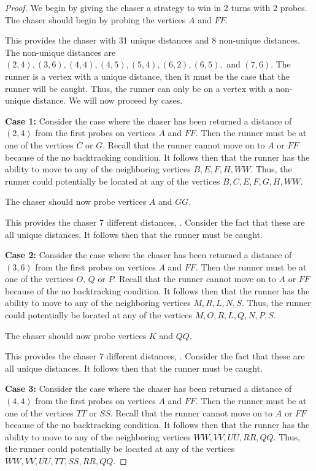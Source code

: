 \documentclass[11pt]{article}
\begin{document}
	\begin{proof}
		We begin by giving the chaser a strategy to win in 2 turns with 2 probes. The chaser should begin by probing the vertices $A$ and $FF$.
		
		This provides the chaser with 31 unique distances and 8 non-unique distances. The non-unique distances are $(2,4),(3,6),(4,4),(4,5),(5,4),(6,2),(6,5),$ and $(7,6)$. The runner is a vertex with a unique distance, then it must be the case that the runner will be caught. Thus, the runner can only be on a vertex with a non-unique distance. We will now proceed by cases.
		
		\textbf{Case 1:} Consider the case where the chaser has been returned a distance of $(2,4)$ from the first probes on vertices $A$ and $FF$. Then the runner must be at one of the vertices $C$ or $G$. Recall that the runner cannot move on to $A$ or $FF$ because of the no backtracking condition. It follows then that the runner has the ability to move to any of the neighboring vertices $B,E,F,H,WW$. Thus, the runner could potentially be located at any of the vertices $B,C,E,F,G,H,WW$.
		
		The chaser should now probe vertices $A$ and $GG$.
		
		This provides the chaser 7 different distances, . Consider the fact that these are all unique distances. It follows then that the runner must be caught.
		
		\textbf{Case 2:} Consider the case where the chaser has been returned a distance of $(3,6)$ from the first probes on vertices $A$ and $FF$. Then the runner must be at one of the vertices $O$, $Q$ or $P$. Recall that the runner cannot move on to $A$ or $FF$ because of the no backtracking condition. It follows then that the runner has the ability to move to any of the neighboring vertices $M,R,L,N,S$. Thus, the runner could potentially be located at any of the vertices $M,O,R,L,Q,N,P,S$.
		
		The chaser should now probe vertices $K$ and $QQ$.
		
		This provides the chaser 7 different distances, . Consider the fact that these are all unique distances. It follows then that the runner must be caught.
		
		\textbf{Case 3:} Consider the case where the chaser has been returned a distance of $(4,4)$ from the first probes on vertices $A$ and $FF$. Then the runner must be at one of the vertices $TT$ or $SS$. Recall that the runner cannot move on to $A$ or $FF$ because of the no backtracking condition. It follows then that the runner has the ability to move to any of the neighboring vertices $WW,VV,UU,RR,QQ$. Thus, the runner could potentially be located at any of the vertices $WW,VV,UU,TT,SS,RR,QQ$.
		

\end{proof}
\end{document}
